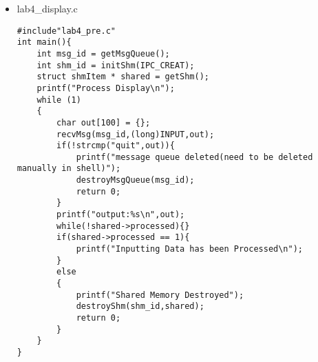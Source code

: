 \documentclass[UTF8]{ctexart}
\begin{document}
\begin{itemize}
\begin{lstlisting}
        for(int i = 0;i < strlen(out);i++){
            int c = (int)out[i];
            //printf("%d",c);
            if((c<= 57 && c>=48)||c == 10){
                fputc(out[i],fp_num);
                fflush(fp_num);
            }
            else if((c<=122 && c>=65)||c==10){
                fputc(out[i],fp_let);
                fflush(fp_let);
            }
        }
        fputc('\n',fp_num);
        fputc('\n',fp_let);
        fflush(fp_num);
        fflush(fp_let);
    }
}
\end{lstlisting}
\item lab4\_display.c
\begin{lstlisting}
#include"lab4_pre.c"
int main(){
    int msg_id = getMsgQueue();
    int shm_id = initShm(IPC_CREAT);
    struct shmItem * shared = getShm();
    printf("Process Display\n");
    while (1)
    {
        char out[100] = {};
        recvMsg(msg_id,(long)INPUT,out);
        if(!strcmp("quit",out)){
            printf("message queue deleted(need to be deleted manually in shell)");
            destroyMsgQueue(msg_id);
            return 0;
        }
        printf("output:%s\n",out);
        while(!shared->processed){}
        if(shared->processed == 1){
            printf("Inputting Data has been Processed\n");
        }
        else
        {
            printf("Shared Memory Destroyed");
            destroyShm(shm_id,shared);
            return 0;
        }
    }
}
\end{lstlisting}
\end{itemize}
\end{document}
